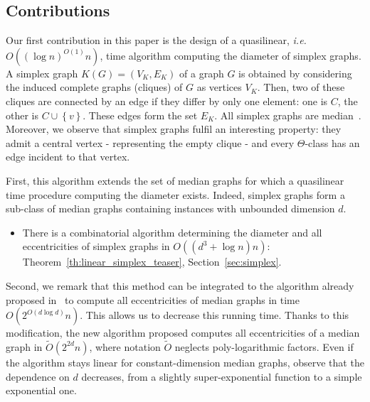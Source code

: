 \documentclass[a4paper,UKenglish,numberwithinsect,cleveref, autoref]{lipics-v2021}
\newcommand{\set}[1]{\left\{ #1 \right\}}
\begin{document}
\subsection{Contributions}

Our first contribution in this paper is the design of a quasilinear, {\em i.e.} $O((\log n)^{O(1)}n)$, time algorithm computing the diameter of simplex graphs. A simplex graph $K(G) = (V_K,E_K)$ of a graph $G$ is obtained by considering the induced complete graphs (cliques) of $G$ as vertices $V_K$. Then, two of these cliques are connected by an edge if they differ by only one element: one is $C$, the other is $C \cup \set{v}$. These edges form the set $E_K$. All simplex graphs are median~\cite{BaCh08,BaLeMo86}. Moreover, we observe that simplex graphs fulfil an interesting property: they admit a central vertex - representing the empty clique - and every $\Theta$-class has an edge incident to that vertex.


First, this algorithm extends the set of median graphs for which a quasilinear time procedure computing the diameter exists. Indeed, simplex graphs form a sub-class of median graphs containing instances with unbounded dimension $d$.

\begin{itemize}
    \item There is a combinatorial algorithm determining the diameter and all eccentricities of simplex graphs in $O((d^3+\log n)n)$: Theorem~\ref{th:linear_simplex_teaser}, Section~\ref{sec:simplex}.
\end{itemize}

Second, we remark that this method can be integrated to the algorithm already proposed in~\cite{BeHa21} to compute all eccentricities of median graphs in time $O(2^{O(d\log d)}n)$. This allows us to decrease this running time. Thanks to this modification, the new algorithm proposed computes all eccentricities of a median graph in $\tilde{O}(2^{2d}n)$, where notation $\tilde{O}$ neglects poly-logarithmic factors. Even if the algorithm stays linear for constant-dimension median graphs, observe that the dependence on $d$ decreases, from a slightly super-exponential function to a simple exponential one.
\end{document}
